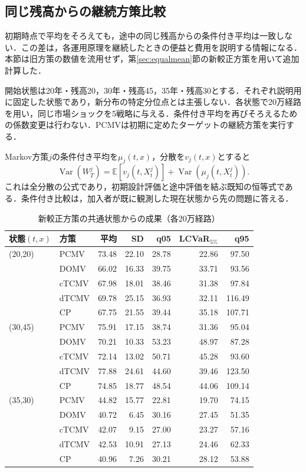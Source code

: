 \documentclass[11pt,a4paper]{article}
\numberwithin{equation}{section}
\numberwithin{table}{section}
\numberwithin{figure}{section}
\theoremstyle{plain}
\theoremstyle{definition}
\newcommand{\E}{\mathbb{E}}
\DeclareMathOperator{\Var}{Var}
\begin{document}
\subsection{同じ残高からの継続方策比較}
初期時点で平均をそろえても，途中の同じ残高からの条件付き平均は一致しない．この差は，各運用原理を継続したときの便益と費用を説明する情報になる．本節は旧方策の数値を流用せず，第\ref{sec:equalmean}節の新較正方策を用いて追加計算した．

開始状態は20年・残高20，30年・残高45，35年・残高30とする．それぞれ説明用に固定した状態であり，新分布の特定分位点とは主張しない．各状態で20万経路を用い，同じ市場ショックを5戦略に与える．条件付き平均を再びそろえるための係数変更は行わない．PCMVは初期に定めたターゲットの継続方策を実行する．

Markov方策$j$の条件付き平均を$\mu_j(t,x)$，分散を$v_j(t,x)$とすると
\begin{equation}
\Var(W_T^j)=\E[v_j(t,X_t^j)]+\Var(\mu_j(t,X_t^j)).\label{eq:totalvar}
\end{equation}
これは全分散の公式であり，初期設計評価と途中評価を結ぶ既知の恒等式である．条件付き比較は，加入者が既に観測した現在状態から先の問題に答える．
\begin{table}[htbp]\centering\small
\caption{新較正方策の共通状態からの成果（各20万経路）}\label{tab:rolling}
\begin{tabular}{llrrrrr}\toprule 状態$(t,x)$ & 方策 & 平均 & SD & q05 & LCVaR$_{5\%}$ & q95\\\midrule
(20,20) & PCMV & 73.48 & 22.10 & 28.78 & 22.86 & 97.50 \\
 & DOMV & 66.02 & 16.33 & 39.75 & 33.71 & 93.56 \\
 & cTCMV & 67.98 & 18.01 & 38.46 & 31.38 & 97.84 \\
 & dTCMV & 69.78 & 25.15 & 36.93 & 32.11 & 116.49 \\
 & CP & 67.75 & 21.55 & 39.44 & 35.18 & 107.71 \\
\midrule
(30,45) & PCMV & 75.91 & 17.15 & 38.74 & 31.36 & 95.04 \\
 & DOMV & 70.21 & 10.33 & 53.23 & 48.97 & 87.28 \\
 & cTCMV & 72.14 & 13.02 & 50.71 & 45.28 & 93.60 \\
 & dTCMV & 77.88 & 24.61 & 44.60 & 39.46 & 123.50 \\
 & CP & 74.85 & 18.77 & 48.54 & 44.06 & 109.14 \\
\midrule
(35,30) & PCMV & 44.82 & 15.77 & 22.81 & 19.70 & 74.15 \\
 & DOMV & 40.72 & 6.45 & 30.16 & 27.45 & 51.35 \\
 & cTCMV & 42.07 & 9.15 & 27.00 & 23.27 & 57.16 \\
 & dTCMV & 42.53 & 10.91 & 27.13 & 24.46 & 62.33 \\
 & CP & 40.96 & 7.26 & 30.21 & 28.12 & 53.88 \\
\bottomrule\end{tabular}\end{table}
\end{document}
